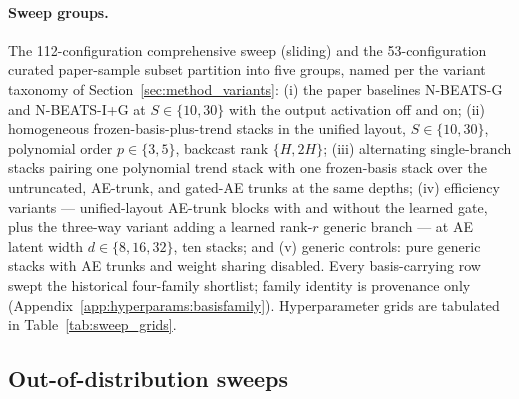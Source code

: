 \paragraph{Sweep groups.} The 112-configuration comprehensive sweep
(sliding) and the 53-configuration curated paper-sample subset partition
into five groups, named per the variant taxonomy of
Section~\ref{sec:method_variants}: (i) the paper baselines N-BEATS-G and
N-BEATS-I+G at $S \in \{10, 30\}$ with the output activation off and on;
(ii) homogeneous frozen-basis-plus-trend stacks in the unified layout,
$S \in \{10, 30\}$, polynomial order $p \in \{3, 5\}$, backcast rank
$\{H, 2H\}$; (iii) alternating single-branch stacks pairing one polynomial
trend stack with one frozen-basis stack over the untruncated, AE-trunk, and
gated-AE trunks at the same depths; (iv) efficiency variants --- unified-layout
AE-trunk blocks with and without the learned gate, plus the three-way
variant adding a learned rank-$r$ generic branch --- at AE latent width
$d \in \{8, 16, 32\}$, ten stacks; and (v) generic controls: pure generic
stacks with AE trunks and weight sharing disabled. Every basis-carrying row
swept the historical four-family shortlist; family identity is provenance
only (Appendix~\ref{app:hyperparams:basisfamily}). Hyperparameter grids are
tabulated in Table~\ref{tab:sweep_grids}.

\subsection{Out-of-distribution sweeps}
\label{app:configs:ood}

